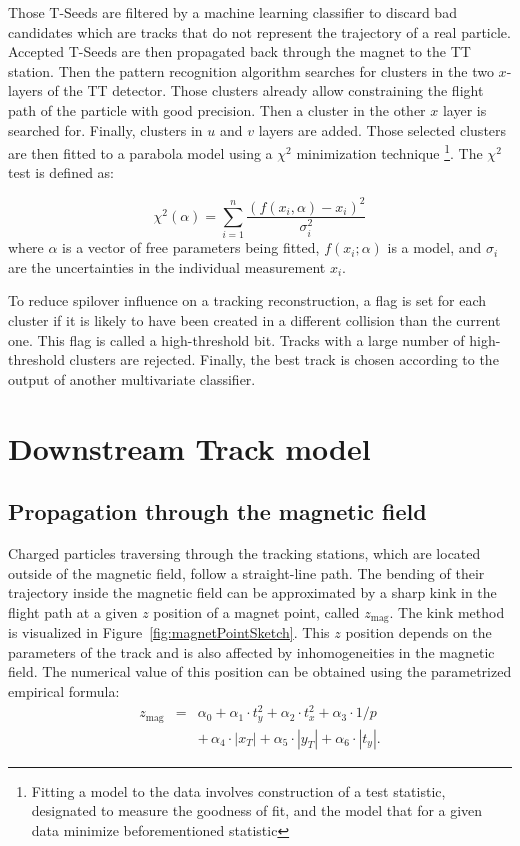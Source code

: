 Those T-Seeds are filtered by a machine learning classifier to discard bad candidates which are tracks that do not represent the trajectory of a real particle. Accepted T-Seeds are then propagated back through the magnet to the TT station. Then the pattern recognition algorithm searches for clusters in the two $x $-layers of the TT detector.  Those clusters already allow constraining the flight path of the particle with good precision. Then a cluster in the other $x$ layer is searched for. Finally, clusters in $u$ and $v$ layers are added. 
 Those selected clusters are then fitted to a parabola model using a $\chi^{2} $ minimization technique \footnote{Fitting a model to the data involves construction of a test statistic, designated to measure the goodness of fit, and the model that for a given data minimize beforementioned statistic}. 
 The $\chi^{2} $ test is defined as:

\begin{equation}
\chi^{2}(\alpha) = \sum_{i=1}^{n} \frac{(f(x_i, \alpha)-x_i)^{2}}{\sigma_{i}^{2}}
\end{equation}
where  $\alpha$ is a vector of free parameters being fitted, $f(x_i;\alpha)$  is a model, and $\sigma_i$ are the uncertainties in the individual measurement $x_i$.  

To reduce spilover influence on a tracking reconstruction, a flag is set for each cluster if it is likely to have been created in a different collision than the current one. This flag is called a high-threshold bit. Tracks with a large number of high-threshold clusters are rejected. 
Finally, the best track is chosen according to the output of another multivariate classifier. 

\section{Downstream Track model}

\subsection{Propagation through the magnetic field}
\label{sec:magPoint}

Charged particles traversing through the tracking
stations, which are located outside of the magnetic field, follow a straight-line path. The bending of their trajectory inside the magnetic field can be approximated by a sharp kink in the flight path at a given $z$ position of a magnet point, called $z_{\text{mag}}$. The kink method is visualized in Figure~\ref{fig:magnetPointSketch}.
This $z$ position depends on the parameters of the track and is also affected by inhomogeneities in the magnetic field. The numerical value of this position can be obtained using the parametrized empirical formula: 
\begin{eqnarray}
\label{eq:zMag}
z_{\text{mag}} & = &\alpha_{0} + \alpha_{1} \cdot t_{y}^{2} + \alpha_{2} \cdot t_{x}^{2} + \alpha_{3} \cdot 1/p \\
& & +\, \alpha_{4} \cdot | x_{T} | + \alpha_{5} \cdot | y_{T} | + \alpha_{6} \cdot | t_{y} |. \nonumber
\end{eqnarray}

